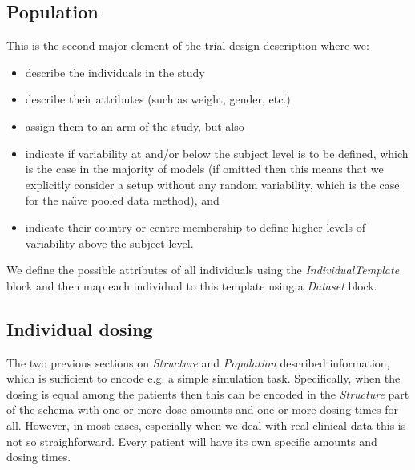 \subsection{Population}
\label{subsec:TrialPopulation}

This is the second major element of the trial design description where we:
\begin{itemize}
\item
describe the individuals in the study
\item
describe their attributes (such as weight, gender, etc.)
\item
assign them to an arm of the study, but also
\item
indicate if variability at and/or below the subject level is to be defined, which is the case in the majority of models (if omitted
then this means that we explicitly consider a setup without any random variability,
which is the case for the na\"{\i}ve pooled data method), and
\item
indicate their country or centre membership to define higher levels of variability above the subject level.
\end{itemize}
We define the possible attributes of all individuals using the \emph{IndividualTemplate} block and then map
each individual to this template using a \emph{Dataset} block.

%
%
%

\subsection{Individual dosing}
\label{subsec:TrialSIndivDosing}

The two previous sections on \emph{Structure} and \emph{Population} described information,
which is sufficient to encode e.g. a simple simulation task. Specifically, when the dosing is 
equal among the patients then this can be encoded in the \emph{Structure} part of the schema with
one or more dose amounts and one or more dosing times for all. However, in most cases, especially
when we deal with real clinical data this is not so straighforward. Every patient will have its own specific 
amounts and dosing times.

